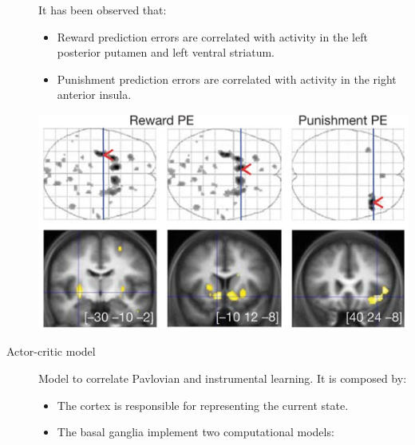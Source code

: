 \begin{description}
        \begin{casestudy}
            It has been observed that:
            \begin{itemize}
                \item Reward prediction errors are correlated with activity in the left posterior putamen and left ventral striatum.
                \item Punishment prediction errors are correlated with activity in the right anterior insula.
            \end{itemize}

            \begin{center}
                \includegraphics[width=0.5\linewidth]{./img/pe_location.png}
            \end{center}
        \end{casestudy}

    \item[Actor-critic model] 
        Model to correlate Pavlovian and instrumental learning. 
        It is composed by:
        \begin{itemize}
            \item The cortex is responsible for representing the current state.
            \item The basal ganglia implement two computational models:
        \end{itemize}
\end{description}

